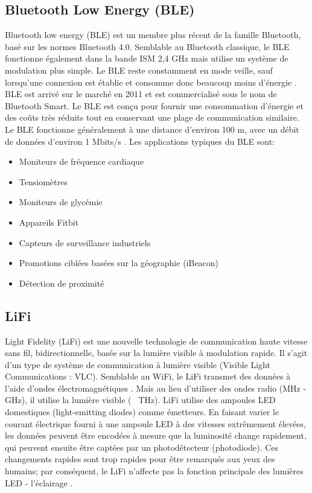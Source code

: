 \subsection{Bluetooth Low Energy (BLE)}
Bluetooth low energy (BLE) est un membre plus récent de la famille Bluetooth, basé sur les normes Bluetooth 4.0. Semblable au Bluetooth classique, le BLE fonctionne également dans la bande ISM 2,4 GHz mais utilise un système de modulation plus simple. Le BLE reste constamment en mode veille, sauf lorsqu'une connexion est établie et consomme donc beaucoup moins d'énergie \cite{chang2014bluetooth}.
BLE est arrivé sur le marché en 2011 et est commercialisé sous le nom de Bluetooth Smart. Le BLE est conçu pour fournir une consommation d'énergie et des coûts très réduits tout en conservant une plage de communication similaire. Le BLE fonctionne généralement à une distance d'environ 100 m, avec un débit de données d'environ 1 Mbits/s \cite{teran2017iot}.
Les applications typiques du BLE sont:
\begin{itemize}
    \item Moniteurs de fréquence cardiaque
\item Tensiomètres
\item 	Moniteurs de glycémie
\item 	Appareils Fitbit
\item Capteurs de surveillance industriels
\item 	Promotions ciblées basées sur la géographie (iBeacon)
\item 	Détection de proximité 

\end{itemize}

\subsection{LiFi}
Light Fidelity (LiFi) est une nouvelle technologie de communication haute vitesse sans fil, bidirectionnelle, basée sur la lumière visible à modulation rapide. Il s'agit d'un type de système de communication à lumière visible (Visible Light Communications : VLC). Semblable au WiFi, le LiFi transmet des données à l'aide d'ondes électromagnétiques \cite{haas2018lifi}. Mais au lieu d'utiliser des ondes radio (MHz - GHz), il utilise la lumière visible (~ THz). LiFi utilise des ampoules LED domestiques (light-emitting diodes) comme émetteurs. En faisant varier le courant électrique fourni à une ampoule LED à des vitesses extrêmement élevées, les données peuvent être encodées à mesure que la luminosité change rapidement, qui peuvent ensuite être captées par un photodétecteur (photodiode). Ces changements rapides sont trop rapides pour être remarqués aux yeux des humains; par conséquent, le LiFi n'affecte pas la fonction principale des lumières LED - l'éclairage \cite{haas2015lifi}. 

